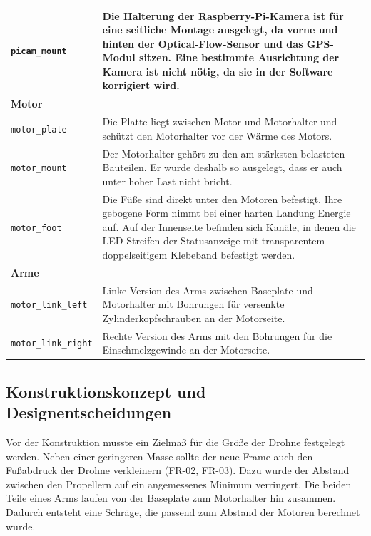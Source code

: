 \begin{table}[H]
\begin{tabularx}{\textwidth}{l X}
            \bauteilrule
            \texttt{picam\_mount} & Die Halterung der Raspberry-Pi-Kamera ist für eine seitliche Montage ausgelegt, da vorne und hinten der Optical-Flow-Sensor und das GPS-Modul sitzen. Eine bestimmte Ausrichtung der Kamera ist nicht nötig, da sie in der Software korrigiert wird.\\
            \midrule
            \multicolumn{2}{l}{\textbf{Motor}} \\
            \texttt{motor\_plate} & Die Platte liegt zwischen Motor und Motorhalter und schützt den Motorhalter vor der Wärme des Motors.\\
            \bauteilrule
            \texttt{motor\_mount} & Der Motorhalter gehört zu den am stärksten belasteten Bauteilen. Er wurde deshalb so ausgelegt, dass er auch unter hoher Last nicht bricht.\\
            \bauteilrule
            \texttt{motor\_foot} & Die Füße sind direkt unter den Motoren befestigt. Ihre gebogene Form nimmt bei einer harten Landung Energie auf. Auf der Innenseite befinden sich Kanäle, in denen die LED-Streifen der Statusanzeige mit transparentem doppelseitigem Klebeband befestigt werden.\\
            \midrule
            \multicolumn{2}{l}{\textbf{Arme}} \\
            \texttt{motor\_link\_left} & Linke Version des Arms zwischen Baseplate und Motorhalter mit Bohrungen für versenkte Zylinderkopfschrauben an der Motorseite.\\
            \bauteilrule
            \texttt{motor\_link\_right} & Rechte Version des Arms mit den Bohrungen für die Einschmelzgewinde an der Motorseite.\\
            \bottomrule
        \end{tabularx}
    \end{table}

        \subsection{Konstruktionskonzept und Designentscheidungen}
        \label{sec:Frame_Konzept}

        Vor der Konstruktion musste ein Zielmaß für die Größe der Drohne festgelegt werden. Neben einer geringeren Masse sollte der neue Frame auch den Fußabdruck der Drohne verkleinern (FR-02, FR-03). Dazu wurde der Abstand zwischen den Propellern auf ein angemessenes Minimum verringert. Die beiden Teile eines Arms laufen von der Baseplate zum Motorhalter hin zusammen. Dadurch entsteht eine Schräge, die passend zum Abstand der Motoren berechnet wurde.

